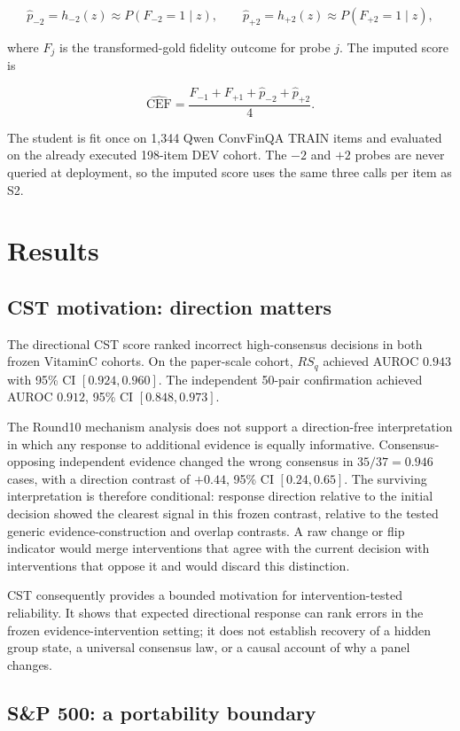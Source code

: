 \documentclass[11pt]{article}
\begin{document}
\[
\hat p_{-2}=h_{-2}(z)\approx P(F_{-2}=1\mid z), \qquad
\hat p_{+2}=h_{+2}(z)\approx P(F_{+2}=1\mid z),
\]

where \(F_j\) is the transformed-gold fidelity outcome for probe \(j\). The imputed score is

\[
\widehat{\mathrm{CEF}}
=
\frac{F_{-1}+F_{+1}+\hat p_{-2}+\hat p_{+2}}{4}.
\]

The student is fit once on 1,344 Qwen ConvFinQA TRAIN items and evaluated on the already executed 198-item DEV cohort. The \(-2\) and \(+2\) probes are never queried at deployment, so the imputed score uses the same three calls per item as S2.

\section{Results}

\subsection{CST motivation: direction matters}

The directional CST score ranked incorrect high-consensus decisions in both frozen VitaminC cohorts. On the paper-scale cohort, \(RS_q\) achieved AUROC \(0.943\) with 95\% CI \([0.924, 0.960]\). The independent 50-pair confirmation achieved AUROC \(0.912\), 95\% CI \([0.848, 0.973]\).

The Round10 mechanism analysis does not support a direction-free interpretation in which any response to additional evidence is equally informative. Consensus-opposing independent evidence changed the wrong consensus in \(35/37=0.946\) cases, with a direction contrast of \(+0.44\), 95\% CI \([0.24, 0.65]\). The surviving interpretation is therefore conditional: response direction relative to the initial decision showed the clearest signal in this frozen contrast, relative to the tested generic evidence-construction and overlap contrasts. A raw change or flip indicator would merge interventions that agree with the current decision with interventions that oppose it and would discard this distinction.

CST consequently provides a bounded motivation for intervention-tested reliability. It shows that expected directional response can rank errors in the frozen evidence-intervention setting; it does not establish recovery of a hidden group state, a universal consensus law, or a causal account of why a panel changes.

\subsection{S\&P 500: a portability boundary}
\end{document}
